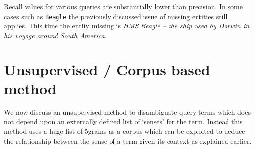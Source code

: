 \documentclass[a4paper,12pt]{report}
\begin{document}
Recall values for various queries are substantially lower than
precision. In some cases such as {\tt Beagle} the previously discussed
issue of missing entities still applies. This time the entity missing
is {\it HMS Beagle -- the ship used by Darwin in his voyage around
  South America}. 

\chapter{Unsupervised / Corpus based method}
We now discuss an unsupervised method to disambiguate query terms
which does not depend upon an externally defined list of `senses' for
the term. Instead this method uses a huge list of 5grams as a corpus
which can be exploited to deduce the relationship between the sense of
a term given its context as explained earlier.
\end{document}
